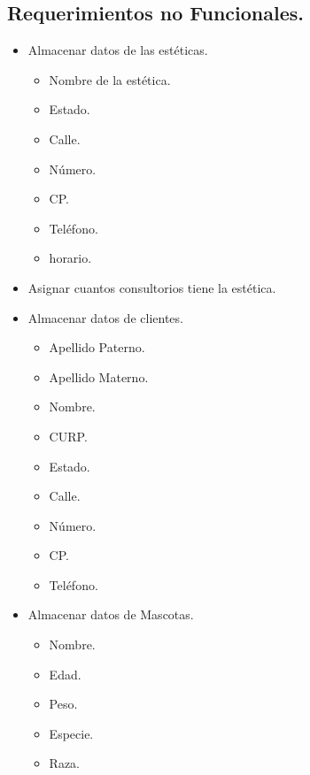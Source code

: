 \documentclass{exam}
\begin{document}
    \subsection{Requerimientos no Funcionales.}
        \begin{itemize}
            \item Almacenar datos de las estéticas.
                \begin{itemize}
                    \item Nombre de la estética.
                    \item Estado.
                    \item Calle.
                    \item Número.
                    \item CP.
                    \item Teléfono.
                    \item horario.
                \end{itemize}
            \item Asignar cuantos consultorios tiene la estética.
            \item Almacenar datos de clientes.
                \begin{itemize}
                    \item Apellido Paterno.
                    \item Apellido Materno.
                    \item Nombre.
                    \item CURP.
                    \item Estado.
                    \item Calle.
                    \item Número.
                    \item CP.
                    \item Teléfono.
                \end{itemize}
            \item Almacenar datos de Mascotas.
                \begin{itemize}
                    \item Nombre.
                    \item Edad.
                    \item Peso.
                    \item Especie.
                    \item Raza.
                \end{itemize}
        \end{itemize}
\end{document}
